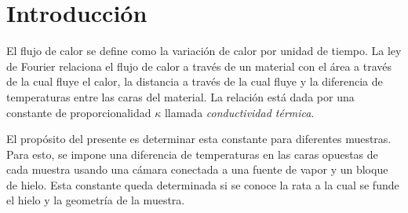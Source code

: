 \section{Introducción}

El flujo de calor se define como la variación de calor por unidad de tiempo. La ley de Fourier relaciona el flujo de calor a través de un material con el área a través de la cual fluye el calor, la distancia a través de la cual fluye y la diferencia de temperaturas entre las caras del material. La relación está dada por una constante de proporcionalidad $\kappa$ llamada \emph{conductividad térmica}.

El propósito del presente es determinar esta constante para diferentes muestras. Para esto, se impone una diferencia de temperaturas en las caras opuestas de cada muestra usando una cámara conectada a una fuente de vapor y un bloque de hielo. Esta constante queda determinada si se conoce la rata a la cual se funde el hielo y la geometría de la muestra.